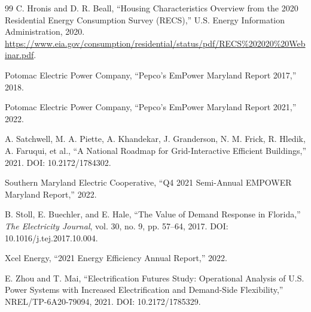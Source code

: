 \documentclass[11pt]{article}
\begin{document}
\begin{thebibliography}{99}
C. Hronis and D. R. Beall, ``Housing Characteristics Overview from the 2020 Residential Energy Consumption Survey (RECS),'' U.S. Energy Information Administration, 2020. \url{https://www.eia.gov/consumption/residential/status/pdf/RECS\%202020\%20Webinar.pdf}.

Potomac Electric Power Company, ``Pepco's EmPower Maryland Report 2017,'' 2018.

Potomac Electric Power Company, ``Pepco's EmPower Maryland Report 2021,'' 2022.

A. Satchwell, M. A. Piette, A. Khandekar, J. Granderson, N. M. Frick, R. Hledik, A. Faruqui, et al., ``A National Roadmap for Grid-Interactive Efficient Buildings,'' 2021. DOI: 10.2172/1784302.

Southern Maryland Electric Cooperative, ``Q4 2021 Semi-Annual EMPOWER Maryland Report,'' 2022.

B. Stoll, E. Buechler, and E. Hale, ``The Value of Demand Response in Florida,'' \textit{The Electricity Journal}, vol. 30, no. 9, pp. 57--64, 2017. DOI: 10.1016/j.tej.2017.10.004.

Xcel Energy, ``2021 Energy Efficiency Annual Report,'' 2022.

E. Zhou and T. Mai, ``Electrification Futures Study: Operational Analysis of U.S. Power Systems with Increased Electrification and Demand-Side Flexibility,'' NREL/TP-6A20-79094, 2021. DOI: 10.2172/1785329.

\end{thebibliography}
\end{document}
